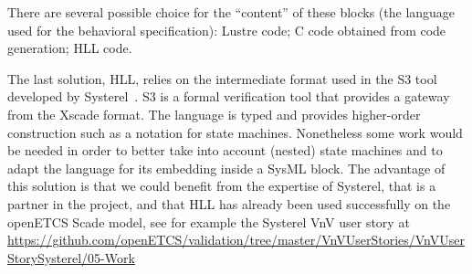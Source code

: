 \documentclass{template/openetcs_report}
\begin{document}
There are several possible choice for the ``content'' of these blocks
(the language used for the behavioral specification): Lustre code; C
code obtained from code generation; HLL code.  

The last solution, HLL, relies on the intermediate format used in the
S3 tool developed by Systerel~\cite{S3}. S3 is a formal verification
tool that provides a gateway from the Xscade format. The language is
typed and provides higher-order construction such as a notation for
state machines. Nonetheless some work would be needed in order to
better take into account (nested) state machines and to adapt the
language for its embedding inside a SysML block. The advantage of this
solution is that we could benefit from the expertise of Systerel, that
is a partner in the project, and that HLL has already been used
successfully on the openETCS Scade model, see for example the Systerel
VnV user story at
\url{https://github.com/openETCS/validation/tree/master/VnVUserStories/VnVUserStorySysterel/05-Work}
\end{document}
